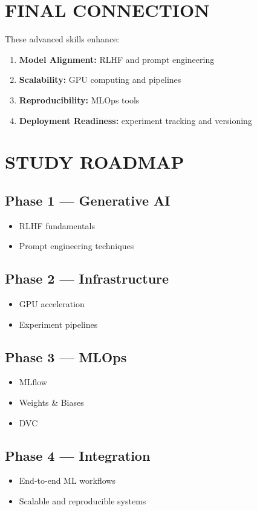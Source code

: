 \section*{FINAL CONNECTION}

These advanced skills enhance:

\begin{enumerate}
\item \textbf{Model Alignment:} RLHF and prompt engineering
\item \textbf{Scalability:} GPU computing and pipelines
\item \textbf{Reproducibility:} MLOps tools
\item \textbf{Deployment Readiness:} experiment tracking and versioning
\end{enumerate}

\vspace{0.5cm}

\section*{STUDY ROADMAP}

\subsection*{Phase 1 --- Generative AI}
\begin{itemize}
\item RLHF fundamentals
\item Prompt engineering techniques
\end{itemize}

\subsection*{Phase 2 --- Infrastructure}
\begin{itemize}
\item GPU acceleration
\item Experiment pipelines
\end{itemize}

\subsection*{Phase 3 --- MLOps}
\begin{itemize}
\item MLflow
\item Weights \& Biases
\item DVC
\end{itemize}

\subsection*{Phase 4 --- Integration}
\begin{itemize}
\item End-to-end ML workflows
\item Scalable and reproducible systems
\end{itemize}